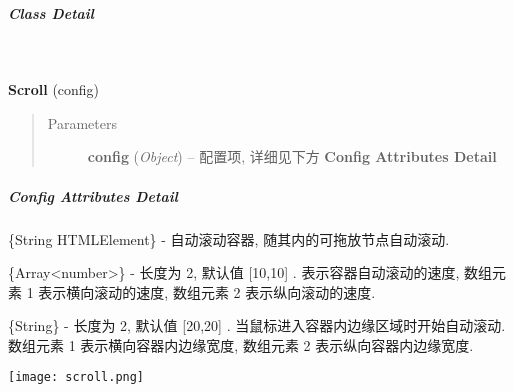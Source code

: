 \documentclass[letterpaper,10pt,english]{sphinxmanual}
\begin{document}
\subparagraph{Class Detail}
\label{api/component/dd/scroll:class-detail}

\begin{fulllineitems}
\label{api/component/dd/scroll:Scroll.Scroll}~
\begin{DUlineblock}{0em}
\item[] \textbf{Scroll} (config)
\end{DUlineblock}
\begin{quote}\begin{description}
\item[{Parameters}] \leavevmode
\textbf{config} (\emph{Object}) -- 配置项, 详细见下方 \textbf{Config Attributes Detail}

\end{description}\end{quote}

\end{fulllineitems}



\subparagraph{Config Attributes Detail}
\label{api/component/dd/scroll:config-attributes-detail}

\begin{fulllineitems}
\label{api/component/dd/scroll:Scroll.node}
\{String \textbar{} HTMLElement\} - 自动滚动容器, 随其内的可拖放节点自动滚动.

\end{fulllineitems}



\begin{fulllineitems}
\label{api/component/dd/scroll:Scroll.rate}
\{Array\textless{}number\textgreater{}\} - 长度为 2, 默认值 {[}10,10{]} . 表示容器自动滚动的速度, 数组元素 1 表示横向滚动的速度, 数组元素 2 表示纵向滚动的速度.

\end{fulllineitems}



\begin{fulllineitems}
\label{api/component/dd/scroll:Scroll.diff}
\{String\} - 长度为 2, 默认值 {[}20,20{]} . 当鼠标进入容器内边缘区域时开始自动滚动.  数组元素 1 表示横向容器内边缘宽度, 数组元素 2 表示纵向容器内边缘宽度.

\texttt{[image: scroll.png]}

\end{fulllineitems}
\end{document}
